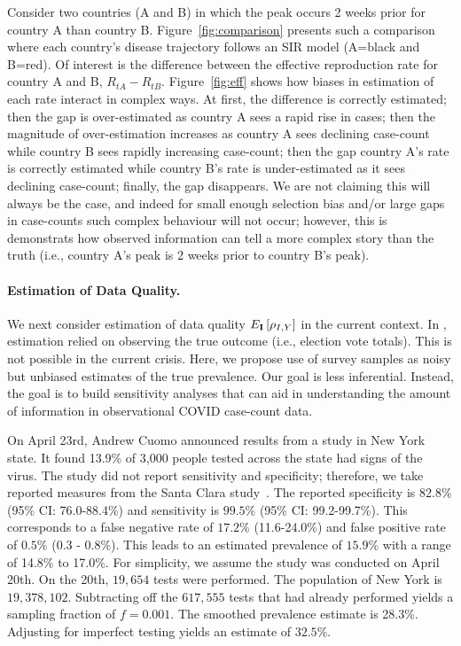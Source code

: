 \documentclass[12pt]{article}
\def\I{{\bf I}}
\begin{document}
Consider two countries (A and B) in which the peak occurs 2 weeks prior for country A than country B.  Figure~\ref{fig:comparison} presents such a comparison where each country's disease trajectory follows an SIR model (A=black and B=red). Of interest is the difference between the effective reproduction rate for country A and B, $R_{tA} - R_{tB}$. Figure~\ref{fig:eff} shows how biases in estimation of each rate interact in complex ways.  At first, the difference  is correctly estimated; then the gap is over-estimated as country A sees a rapid rise in cases; then the magnitude of over-estimation increases as country A sees declining case-count while country B sees rapidly increasing case-count; then the gap country A's rate is correctly estimated while country B's rate is under-estimated as it sees declining case-count; finally, the gap disappears.  We are not claiming this will always be the case, and indeed for small enough selection bias and/or large gaps in case-counts such complex behaviour will not occur; however, this is demonstrats how observed information can tell a more complex story than the truth (i.e., country A's peak is 2 weeks prior to country B's peak).

\paragraph*{Estimation of Data Quality.} We next consider estimation of data quality $E_{\I} \left[ \rho_{I,Y} \right]$ in the current context. In \cite{Meng2018}, estimation relied on observing the true outcome (i.e., election vote totals).  This is not possible in the current crisis.  Here, we propose use of survey samples as noisy but unbiased estimates of the true prevalence. Our goal is less inferential. Instead, the goal is to build sensitivity analyses that can aid in understanding the amount of information in observational COVID case-count data.

On April 23rd, Andrew Cuomo announced results from a study in New York state.  It found 13.9\% of 3,000 people tested across the state had signs of the virus.  The study did not report sensitivity and specificity; therefore, we take reported measures from the Santa Clara study~\cite{Bendavid2020}.  The reported specificity is $82.8\%$ (95\% CI: 76.0-88.4\%) and sensitivity is $99.5\%$ (95\% CI: 99.2-99.7\%).  This corresponds to a false negative rate of $17.2\%$ (11.6-24.0\%) and false positive rate of $0.5\%$ (0.3 - 0.8\%).  This leads to an estimated prevalence of $15.9\%$ with a range of 14.8\% to 17.0\%. For simplicity, we assume the study was conducted on April 20th. On the 20th,  $19,654$ tests were performed. The population of New York is $19,378,102$.   Subtracting off the $617,555$ tests that had already performed yields a sampling fraction of $f = 0.001$.  The smoothed prevalence estimate is 28.3\%.  Adjusting for imperfect testing yields an estimate of $32.5\%$.
\end{document}
